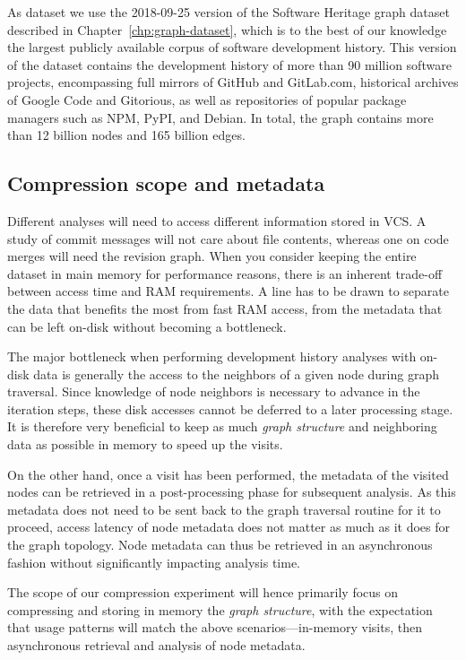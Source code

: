 As dataset we use the 2018-09-25 version of the Software Heritage graph dataset
described in Chapter~\ref{chp:graph-dataset}, which is to the best of our
knowledge the largest publicly available corpus of software development
history. This version of the dataset contains the development history of more
than 90 million software projects, encompassing full mirrors of GitHub and
GitLab.com, historical archives of Google Code and Gitorious, as well as
repositories of popular package managers such as NPM, PyPI, and Debian.
In total, the graph contains more than 12 billion nodes and 165 billion edges.

\subsection{Compression scope and metadata}%
\label{sec:compression-comp-scope}

Different analyses will need to access different information stored in
\gls{VCS}\@. A study of commit messages will not care about file contents,
whereas one on code merges will need the revision graph. When you consider
keeping the entire dataset in main memory for performance reasons, there is an
inherent trade-off between access time and RAM requirements. A line has to be
drawn to separate the data that benefits the most from fast RAM access, from
the metadata that can be left on-disk without becoming a bottleneck.

The major bottleneck when performing development history analyses with on-disk
data is generally the access to the neighbors of a given node during graph
traversal. Since knowledge of node neighbors is necessary to advance in the
iteration steps, these disk accesses cannot be deferred to a later processing
stage. It is therefore very beneficial to keep as much \emph{graph structure}
and neighboring data as possible in memory to speed up the visits.

On the other hand, once a visit has been performed, the metadata of the visited
nodes can be retrieved in a post-processing phase for subsequent analysis. As
this metadata does not need to be sent back to the graph traversal routine for
it to proceed, access latency of node metadata does not matter as much as it
does for the graph topology. Node metadata can thus be retrieved in an
asynchronous fashion without significantly impacting analysis time.

The scope of our compression experiment will hence primarily focus on
compressing and storing in memory the \emph{graph structure}, with the
expectation that usage patterns will match the above scenarios---in-memory
visits, then asynchronous retrieval and analysis of node metadata.

